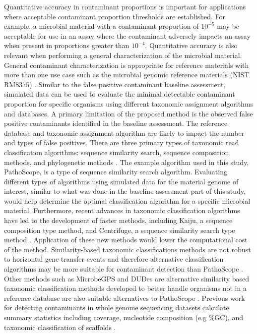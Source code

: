 \documentclass[fleqn,10pt,lineno]{wlpeerj}\usepackage[]{graphicx}\usepackage[]{color}
\begin{document}
Quantitative accuracy in contaminant proportions is important for applications where acceptable contaminant proportion thresholds are established.
For example, a microbial material with a contaminant proportion of $10^{-5}$ may be acceptable for use in an assay where the contaminant adversely impacts an assay when present in proportions greater than $10^{-4}$.
Quantitative accuracy is also relevant when performing a general characterization of the microbial material.
General contaminant characterization is appropriate for reference materials with more than one use case such as the microbial genomic reference materials (NIST RM8375) \citep{olson2016pepr}.
Similar to the false positive contaminant baseline assessment,
simulated data can be used to evaluate the minimal detectable contaminant proportion for specific organisms using different taxonomic assignment algorithms and databases.
A primary limitation of the proposed method is the observed false positive contaminants identified in the baseline assessment. 
The reference database and taxonomic assignment algorithm are likely to impact the number and types of false positives. 
There are three primary types of taxonomic read classification algorithms: sequence similarity search, sequence composition methods, and phylogenetic methods \citep{Bazinet2012}. 
The example algorithm used in this study, PathoScope, is a type of sequence similarity search algorithm. 
Evaluating different types of algorithms using simulated data for the material genome of interest, similar to what was done in the baseline assessment part of this study, would help determine the optimal classification algorithm for a specific microbial material. 
Furthermore, recent advances in taxonomic classification algorithms have led to the development of faster methods, including Kaiju, a sequence composition type method, and Centrifuge, a sequence similarity search type method \citep{menzel2016fast,Kim2016-ir}. 
Application of these new methods would lower the computational cost of the method. 
Similarity-based taxonomic classifications methods are not robust to horizontal gene transfer events and therefore alternative classification algorithms may be more suitable for contaminant detection than PathoScope \citep{kunin2008bioinformatician,weng2010reanalyze}.
Other methods such as MicrobeGPS and DUDes are alternative similarity based taxonomic classification methods developed to better handle organisms not in a reference database are also suitable alternatives to PathoScope \citep{lindner2015metagenomic,piro2016dudes}. 
Previous work for detecting contaminants in whole genome sequencing datasets calculate summary statistics including coverage, nucleotide composition (e.g \%GC), and taxonomic classification of scaffolds \citep{kumar2013blobology,delmont2016identifying}. 
\end{document}
